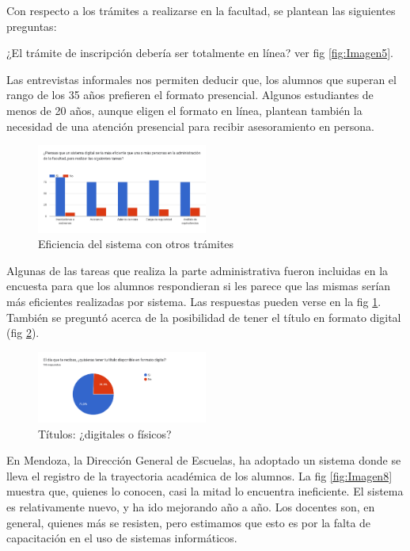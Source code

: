 \documentclass[a4paper]{article}
\begin{document}
Con respecto a los trámites a realizarse en la facultad, se plantean las siguientes preguntas:

¿El trámite de inscripción debería ser totalmente en línea? ver fig \ref{fig:Imagen5}. 

Las entrevistas informales nos permiten deducir que, los alumnos que superan el rango de los 35 años prefieren el formato presencial. Algunos estudiantes de menos de 20 años, aunque eligen el formato en línea, plantean también la necesidad de una atención presencial para recibir asesoramiento en persona. 

\begin{figure}
\centering
\includegraphics[width=0.5\textwidth]{Imagen6.png}
\caption{\label{fig:Imagen6}Eficiencia del sistema con otros trámites}
\end{figure}

Algunas de las tareas que realiza la parte administrativa fueron incluidas en la encuesta para que los alumnos respondieran si les parece que las mismas serían más eficientes realizadas por sistema. Las respuestas pueden verse en la fig \ref{fig:Imagen6}. También se preguntó acerca de la posibilidad de tener el título en formato digital (fig \ref{fig:Imagen7}). 

\begin{figure}
\centering
\includegraphics[width=0.5\textwidth]{Imagen7.png}
\caption{\label{fig:Imagen7}Títulos: ¿digitales o físicos?}
\end{figure}

En Mendoza, la Dirección General de Escuelas, ha adoptado un sistema donde se lleva el registro de la trayectoria académica de los alumnos. La fig \ref{fig:Imagen8} muestra que, quienes lo conocen, casi la mitad lo encuentra ineficiente. El sistema es relativamente nuevo, y ha ido mejorando año a año. Los docentes son, en general, quienes más se resisten, pero estimamos que esto es por la falta de capacitación en el uso de sistemas informáticos. 
\end{document}
